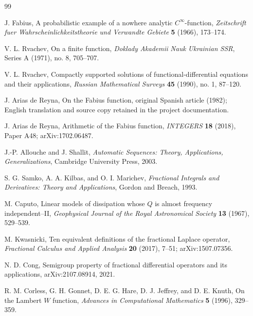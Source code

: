 \documentclass[11pt,oneside]{article}
\theoremstyle{definition}
\theoremstyle{remark}
\newcommand{\1}{\mathbf 1}
\begin{document}
\begin{thebibliography}{99}

J. Fabius,
\newblock A probabilistic example of a nowhere analytic $C^\infty$-function,
\newblock \emph{Zeitschrift fuer Wahrscheinlichkeitstheorie und Verwandte Gebiete}
\textbf{5} (1966), 173--174.

V. L. Rvachev,
\newblock On a finite function,
\newblock \emph{Doklady Akademii Nauk Ukrainian SSR}, Series A (1971), no. 8, 705--707.

V. L. Rvachev,
\newblock Compactly supported solutions of functional-differential equations and their
applications,
\newblock \emph{Russian Mathematical Surveys} \textbf{45} (1990), no. 1, 87--120.

J. Arias de Reyna,
\newblock On the Fabius function,
\newblock original Spanish article (1982); English translation and source copy retained in the
project documentation.

J. Arias de Reyna,
\newblock Arithmetic of the Fabius function,
\newblock \emph{INTEGERS} \textbf{18} (2018), Paper A48; arXiv:1702.06487.

J.-P. Allouche and J. Shallit,
\newblock \emph{Automatic Sequences: Theory, Applications, Generalizations},
\newblock Cambridge University Press, 2003.

S. G. Samko, A. A. Kilbas, and O. I. Marichev,
\newblock \emph{Fractional Integrals and Derivatives: Theory and Applications},
\newblock Gordon and Breach, 1993.

M. Caputo,
\newblock Linear models of dissipation whose $Q$ is almost frequency independent--II,
\newblock \emph{Geophysical Journal of the Royal Astronomical Society} \textbf{13} (1967),
529--539.

M. Kwasnicki,
\newblock Ten equivalent definitions of the fractional Laplace operator,
\newblock \emph{Fractional Calculus and Applied Analysis} \textbf{20} (2017), 7--51;
arXiv:1507.07356.

N. D. Cong,
\newblock Semigroup property of fractional differential operators and its applications,
\newblock arXiv:2107.08914, 2021.

R. M. Corless, G. H. Gonnet, D. E. G. Hare, D. J. Jeffrey, and D. E. Knuth,
\newblock On the Lambert $W$ function,
\newblock \emph{Advances in Computational Mathematics} \textbf{5} (1996), 329--359.


\end{thebibliography}
\end{document}
